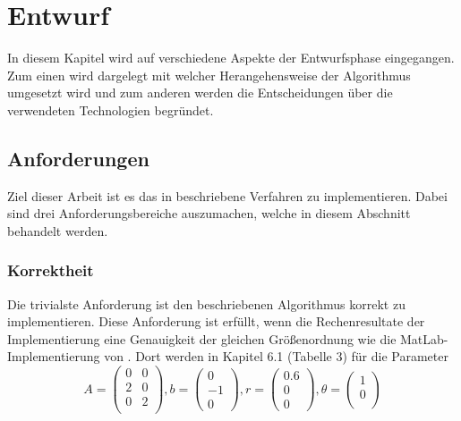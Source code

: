 \chapter{Entwurf}\label{desgin}
In diesem Kapitel wird auf verschiedene Aspekte der Entwurfsphase eingegangen.
Zum einen wird dargelegt mit welcher Herangehensweise der Algorithmus umgesetzt wird und zum anderen werden die Entscheidungen über die verwendeten Technologien begründet.

\section{Anforderungen}

Ziel dieser Arbeit ist es das in \cite*[]{gasperini:hal-03209144} beschriebene Verfahren zu implementieren.
Dabei sind drei Anforderungsbereiche auszumachen, welche in diesem Abschnitt behandelt werden.


\subsection{Korrektheit}

Die trivialste Anforderung ist den beschriebenen Algorithmus korrekt zu implementieren.
Diese Anforderung ist erfüllt, wenn die Rechenresultate der Implementierung eine Genauigkeit der gleichen Größenordnung wie die MatLab-Implementierung von \cite*[]{gasperini:hal-03209144}.
Dort werden in Kapitel 6.1 (Tabelle 3) für die Parameter 
\begin{equation}
    A = \begin{pmatrix}
        0 & 0 \\
        2 & 0 \\
        0 & 2 \\
    \end{pmatrix}, b = \begin{pmatrix}
        0 \\ -1 \\ 0
    \end{pmatrix},
    r = \begin{pmatrix}
        0.6 \\ 0 \\0 
    \end{pmatrix},
    \theta = \begin{pmatrix}
        1 \\ 0 \\
    \end{pmatrix}
\end{equation}

